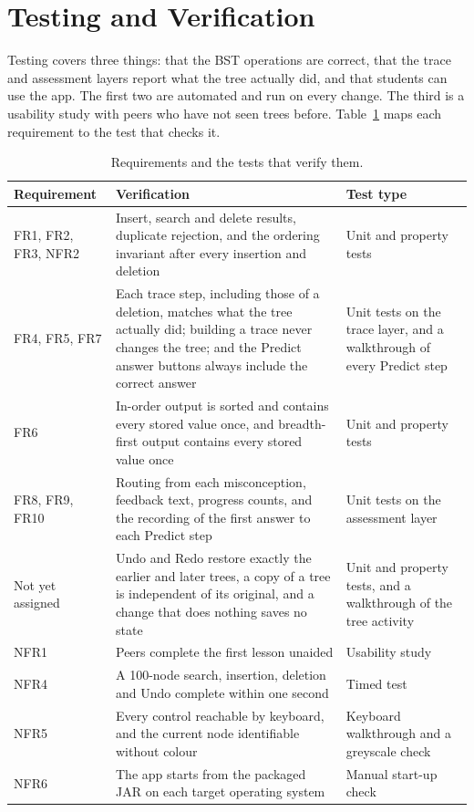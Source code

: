 \section{Testing and Verification}\label{sec:testing}


Testing covers three things: that the BST operations are correct, that the trace and assessment layers report what the tree actually did, and that students can use the app. The first two are automated and run on every change. The third is a usability study with peers who have not seen trees before. Table~\ref{tab:testmatrix} maps each requirement to the test that checks it.

\begin{table}[H]
\centering
\small
\caption{Requirements and the tests that verify them.}
\label{tab:testmatrix}
\begin{tabularx}{\textwidth}{p{2.2cm} p{4.4cm} X}
\toprule
Requirement & Verification & Test type \\
\midrule
FR1, FR2, FR3, NFR2 & Insert, search and delete results, duplicate rejection, and the ordering invariant after every insertion and deletion & Unit and property tests \\
FR4, FR5, FR7 & Each trace step, including those of a deletion, matches what the tree actually did; building a trace never changes the tree; and the Predict answer buttons always include the correct answer & Unit tests on the trace layer, and a walkthrough of every Predict step \\
FR6 & In-order output is sorted and contains every stored value once, and breadth-first output contains every stored value once & Unit and property tests \\
FR8, FR9, FR10 & Routing from each misconception, feedback text, progress counts, and the recording of the first answer to each Predict step & Unit tests on the assessment layer \\
Not yet assigned & Undo and Redo restore exactly the earlier and later trees, a copy of a tree is independent of its original, and a change that does nothing saves no state & Unit and property tests, and a walkthrough of the tree activity \\
NFR1 & Peers complete the first lesson unaided & Usability study \\
NFR4 & A 100-node search, insertion, deletion and Undo complete within one second & Timed test \\
NFR5 & Every control reachable by keyboard, and the current node identifiable without colour & Keyboard walkthrough and a greyscale check \\
NFR6 & The app starts from the packaged JAR on each target operating system & Manual start-up check \\
\bottomrule
\end{tabularx}
\end{table}

